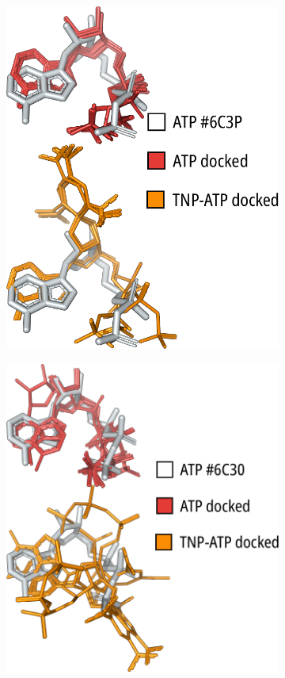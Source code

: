 \begin{figure}[hbtp]
\begin{subfigure}[t]{0.28\textwidth}
		\includegraphics[width=\textwidth]{6c3p_docking.pdf}
	\end{subfigure}
	\hfill
	\begin{subfigure}[t]{0.30\textwidth}
		\caption{}\label{ch3fig:6c3o_docking}
		\centering
		\includegraphics[width=\textwidth]{6c3o_docking.pdf}

\end{subfigure}
\end{figure}
